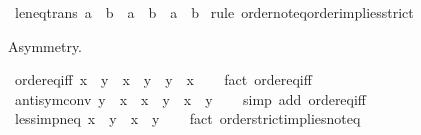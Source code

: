 \begin{isabellebody}
\isamarkupfalse%
\ le{\isacharunderscore}{\kern0pt}neq{\isacharunderscore}{\kern0pt}trans{\isacharcolon}{\kern0pt}\ {\isachardoublequoteopen}a\ {\isasymle}\ b\ {\isasymLongrightarrow}\ a\ {\isasymnoteq}\ b\ {\isasymLongrightarrow}\ a\ {\isacharless}{\kern0pt}\ b{\isachardoublequoteclose}\isanewline
%
\isadelimproof
%
\endisadelimproof
%
\isatagproof
{}\isamarkupfalse%
\ {\isacharparenleft}{\kern0pt}rule\ order{\isachardot}{\kern0pt}not{\isacharunderscore}{\kern0pt}eq{\isacharunderscore}{\kern0pt}order{\isacharunderscore}{\kern0pt}implies{\isacharunderscore}{\kern0pt}strict{\isacharparenright}{\kern0pt}%
\endisatagproof
{\isafoldproof}%
%
\isadelimproof
%
\endisadelimproof
%
\begin{isamarkuptext}%
Asymmetry.%
\end{isamarkuptext}\isamarkuptrue%
\isamarkupfalse%
\ order{\isacharunderscore}{\kern0pt}eq{\isacharunderscore}{\kern0pt}iff{\isacharcolon}{\kern0pt}\ {\isachardoublequoteopen}x\ {\isacharequal}{\kern0pt}\ y\ {\isasymlongleftrightarrow}\ x\ {\isasymle}\ y\ {\isasymand}\ y\ {\isasymle}\ x{\isachardoublequoteclose}\isanewline
%
\isadelimproof
\ \ %
\endisadelimproof
%
\isatagproof
{}\isamarkupfalse%
\ {\isacharparenleft}{\kern0pt}fact\ order{\isachardot}{\kern0pt}eq{\isacharunderscore}{\kern0pt}iff{\isacharparenright}{\kern0pt}%
\endisatagproof
{\isafoldproof}%
%
\isadelimproof
\isanewline
%
\endisadelimproof
\isanewline
{}\isamarkupfalse%
\ antisym{\isacharunderscore}{\kern0pt}conv{\isacharcolon}{\kern0pt}\ {\isachardoublequoteopen}y\ {\isasymle}\ x\ {\isasymLongrightarrow}\ x\ {\isasymle}\ y\ {\isasymlongleftrightarrow}\ x\ {\isacharequal}{\kern0pt}\ y{\isachardoublequoteclose}\isanewline
%
\isadelimproof
\ \ %
\endisadelimproof
%
\isatagproof
{}\isamarkupfalse%
\ {\isacharparenleft}{\kern0pt}simp\ add{\isacharcolon}{\kern0pt}\ order{\isachardot}{\kern0pt}eq{\isacharunderscore}{\kern0pt}iff{\isacharparenright}{\kern0pt}%
\endisatagproof
{\isafoldproof}%
%
\isadelimproof
\isanewline
%
\endisadelimproof
\isanewline
{}\isamarkupfalse%
\ less{\isacharunderscore}{\kern0pt}imp{\isacharunderscore}{\kern0pt}neq{\isacharcolon}{\kern0pt}\ {\isachardoublequoteopen}x\ {\isacharless}{\kern0pt}\ y\ {\isasymLongrightarrow}\ x\ {\isasymnoteq}\ y{\isachardoublequoteclose}\isanewline
%
\isadelimproof
\ \ %
\endisadelimproof
%
\isatagproof
{}\isamarkupfalse%
\ {\isacharparenleft}{\kern0pt}fact\ order{\isachardot}{\kern0pt}strict{\isacharunderscore}{\kern0pt}implies{\isacharunderscore}{\kern0pt}not{\isacharunderscore}{\kern0pt}eq{\isacharparenright}{\kern0pt}%

\end{isabellebody}
